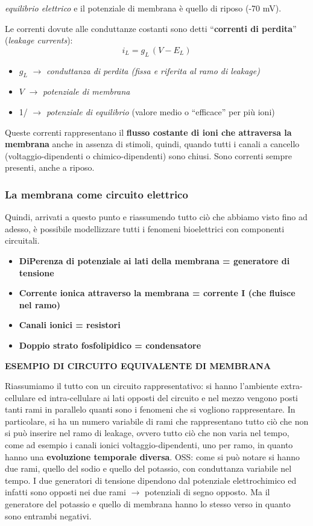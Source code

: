 \documentclass[12pt,a4paper,openany]{book}
\begin{document}
\textit{equilibrio elettrico }e il potenziale di membrana è quello di riposo (-70 mV).

Le correnti dovute alle conduttanze costanti sono detti ``\textbf{correnti di perdita}'' (\textit{leakage currents}):
\[
  i_L = g_L\,(V - E_L)
\]
\begin{itemize}
  \item $g_L$ $\rightarrow$ \textit{conduttanza di perdita (fissa e riferita al ramo di leakage)}
  \item $V$ $\rightarrow$ \textit{potenziale di membrana}
  \item 1/ $\rightarrow$ \textit{potenziale di equilibrio }(valore medio o ``efficace'' per più ioni)
\end{itemize}
Queste correnti rappresentano il \textbf{flusso costante di ioni che attraversa la membrana }anche in assenza di stimoli, quindi, quando tutti i canali a cancello (voltaggio-dipendenti o chimico-dipendenti) sono chiusi. Sono correnti sempre presenti, anche a riposo.

\subsubsection{La membrana come circuito elettrico}

Quindi, arrivati a questo punto e riassumendo tutto ciò che abbiamo visto fino ad adesso, è possibile modellizzare tutti i fenomeni bioelettrici con componenti circuitali.

\begin{itemize}
  \item \textbf{DiPerenza di potenziale ai lati della membrana = generatore di tensione}
  \item \textbf{Corrente ionica attraverso la membrana = corrente I (che fluisce nel ramo)}
  \item \textbf{Canali ionici = resistori}
  \item \textbf{Doppio strato fosfolipidico = condensatore}
\end{itemize}
\textbf{ESEMPIO DI CIRCUITO EQUIVALENTE DI MEMBRANA}

Riassumiamo il tutto con un circuito rappresentativo: si hanno l'ambiente extra-cellulare ed intra-cellulare ai lati opposti del circuito e nel mezzo vengono posti tanti rami in parallelo quanti sono i fenomeni che si vogliono
rappresentare. In particolare, si ha un numero variabile di rami che rappresentano tutto ciò che non si può inserire nel ramo di leakage, ovvero tutto ciò che non varia nel tempo, come ad esempio i canali ionici voltaggio-dipendenti, uno per ramo, in quanto hanno una \textbf{evoluzione temporale diversa}.
OSS: come si può notare si hanno due rami, quello del sodio e quello del potassio, con conduttanza variabile nel tempo. I due generatori di tensione dipendono dal potenziale elettrochimico ed infatti sono opposti nei due rami $\rightarrow$ potenziali di segno opposto. Ma il generatore del potassio e quello di membrana hanno lo stesso verso in quanto sono entrambi negativi.
\end{document}
